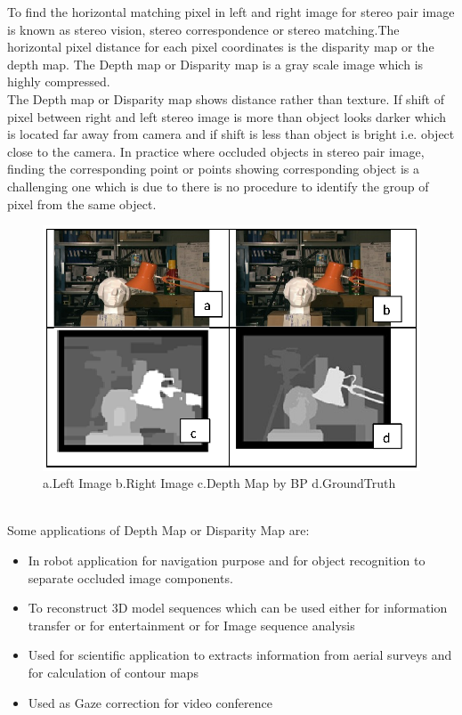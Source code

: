 To find the horizontal matching pixel in left and right image for stereo pair image is known as stereo vision, stereo correspondence or stereo matching.The horizontal pixel distance for each pixel coordinates is the disparity map or the depth map. The Depth map or Disparity map is a gray scale image which is highly compressed.\\ The Depth map or Disparity map shows distance rather than texture. If shift of pixel between  right and left stereo image is more than object looks darker which is located far away from camera and if shift is less than object is bright i.e. object close to the camera. In practice where occluded objects in stereo pair image, finding the corresponding point or points showing corresponding object is a challenging one which is due to there is no procedure to identify the group of pixel from the same object.
\begin{figure}[h]
  \includegraphics[width=5in]{sampledm.eps}
  \caption{a.Left Image b.Right Image c.Depth Map by BP d.GroundTruth} \label{rp}
\end{figure}
\\ Some applications of Depth Map or Disparity Map  are:\begin{itemize}
                                                       \item {In robot application for navigation purpose and for object recognition to separate occluded image components.} 
                                                       \item {To reconstruct 3D model sequences which can be used either for information transfer or for entertainment or for Image sequence analysis}
                                                       \item {Used for scientific application to extracts information from aerial surveys and for calculation of contour maps }
                                                     \item{  Used as  Gaze correction for video conference}
                                                     \end{itemize}
